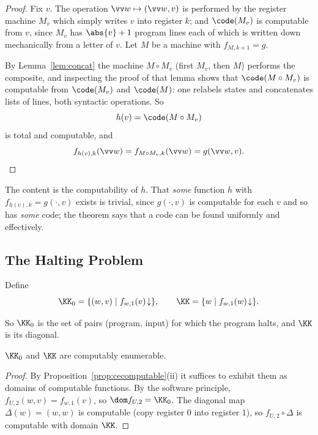 \begin{proof}
	Fix $v$. The operation $\vv w \mapsto (\vv w, v)$ is performed by the register machine $M_v$ which simply writes $v$ into register $k$; and $\code(M_v)$ is computable from $v$, since $M_v$ has $\abs{v}+1$ program lines each of which is written down mechanically from a letter of $v$. Let $M$ be a machine with $f_{M,k+1} = g$.

	By Lemma~\ref{lem:concat} the machine $M \circ M_v$ (first $M_v$, then $M$) performs the composite, and inspecting the proof of that lemma shows that $\code(M\circ M_v)$ is computable from $\code(M_v)$ and $\code(M)$: one relabels states and concatenates lists of lines, both syntactic operations. So
	$$h(v) = \code(M \circ M_v)$$
	is total and computable, and
	$$f_{h(v),k}(\vv w) = f_{M\circ M_v, k}(\vv w) = g(\vv w, v). \qedhere$$
\end{proof}

\begin{remark}
	The content is the computability of $h$. That \emph{some} function $h$ with $f_{h(v),k} = g(\cdot,v)$ exists is trivial, since $g(\cdot,v)$ is computable for each $v$ and so has \emph{some} code; the theorem says that a code can be found uniformly and effectively.
\end{remark}

\subsection{The Halting Problem}

\begin{definition}
	Define
	$$\KK_0 = \{(w,v) \mid f_{w,1}(v)\!\downarrow\}, \qquad \KK = \{w \mid f_{w,1}(w)\!\downarrow\}.$$
\end{definition}

So $\KK_0$ is the set of pairs (program, input) for which the program halts, and $\KK$ is its diagonal.

\begin{theorem}
	$\KK_0$ and $\KK$ are computably enumerable.
\end{theorem}

\begin{proof}
	By Proposition~\ref{prop:cecomputable}(ii) it suffices to exhibit them as domains of computable functions. By the software principle, $f_{U,2}(w,v) = f_{w,1}(v)$, so $\dom f_{U,2} = \KK_0$. The diagonal map $\Delta(w) = (w,w)$ is computable (copy register $0$ into register $1$), so $f_{U,2}\circ\Delta$ is computable with domain $\KK$.
\end{proof}

